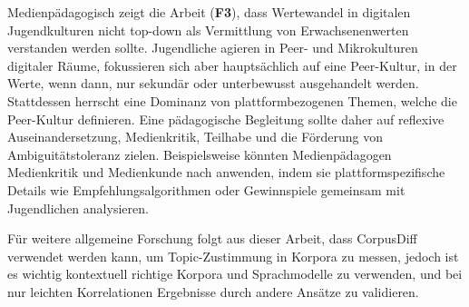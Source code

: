 Medienpädagogisch zeigt die Arbeit (\textbf{F3}), dass Wertewandel in digitalen Jugendkulturen nicht top-down als Vermittlung von Erwachsenenwerten verstanden werden sollte.
Jugendliche agieren in Peer- und Mikrokulturen digitaler Räume, fokussieren sich aber hauptsächlich auf eine Peer-Kultur, in der Werte, wenn dann, nur sekundär oder unterbewusst ausgehandelt werden.
Stattdessen herrscht eine Dominanz von plattformbezogenen Themen, welche die Peer-Kultur definieren.
Eine pädagogische Begleitung sollte daher auf reflexive Auseinandersetzung, Medienkritik, Teilhabe und die Förderung von Ambiguitätstoleranz zielen.
Beispielsweise könnten Medienpädagogen Medienkritik und Medienkunde nach \textcite{Ba99} anwenden, indem sie plattformspezifische Details wie Empfehlungsalgorithmen oder Gewinnspiele gemeinsam mit Jugendlichen analysieren.

Für weitere allgemeine Forschung folgt aus dieser Arbeit, dass CorpusDiff verwendet werden kann, um Topic-Zustimmung in Korpora zu messen, jedoch ist es wichtig kontextuell richtige Korpora und Sprachmodelle zu verwenden, und bei nur leichten Korrelationen Ergebnisse durch andere Ansätze zu validieren.

